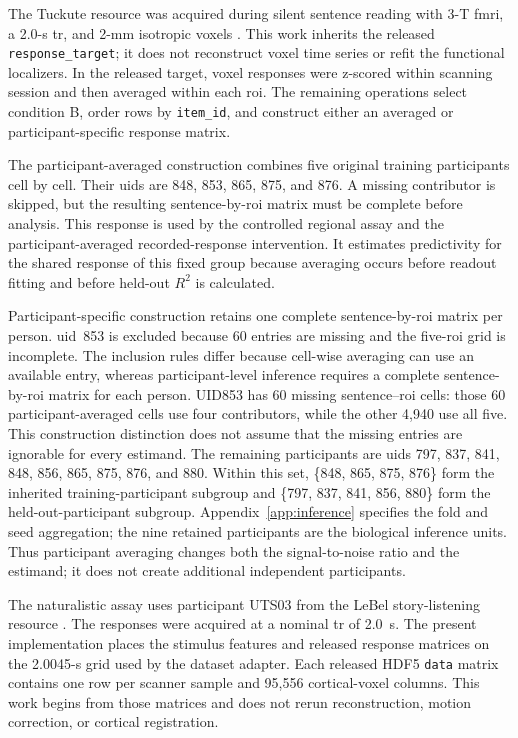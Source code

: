 The Tuckute resource was acquired during silent sentence reading with 3-T \ac{fmri}, a 2.0-s \ac{tr}, and 2-mm isotropic voxels \autocite{tuckute2024}. 
This work inherits the released \texttt{response\_target}; it does not reconstruct voxel time series or refit the functional localizers.
In the released target, voxel responses were z-scored within scanning session and then averaged within each \ac{roi}.
The remaining operations select condition B, order rows by \texttt{item\_id}, and construct either an averaged or participant-specific response matrix. 

The participant-averaged construction combines five original training participants cell by cell.
Their \acp{uid} are 848, 853, 865, 875, and 876.
A missing contributor is skipped, but the resulting sentence-by-\ac{roi} matrix must be complete before analysis.
This response is used by the controlled regional assay and the participant-averaged recorded-response intervention.
It estimates predictivity for the shared response of this fixed group because averaging occurs before readout fitting and before held-out $R^2$ is calculated.

Participant-specific construction retains one complete sentence-by-\ac{roi} matrix per person.
\ac{uid}~853 is excluded because 60 entries are missing and the five-\ac{roi} grid is incomplete.
The inclusion rules differ because cell-wise averaging can use an available entry, whereas participant-level inference requires a complete sentence-by-\ac{roi} matrix for each person.
UID853 has 60 missing sentence--\ac{roi} cells: those 60 participant-averaged cells use four contributors, while the other 4,940 use all five.
This construction distinction does not assume that the missing entries are ignorable for every estimand.
The remaining participants are \acp{uid} 797, 837, 841, 848, 856, 865, 875, 876, and 880.
Within this set, \{848, 865, 875, 876\} form the inherited training-participant subgroup and \{797, 837, 841, 856, 880\} form the held-out-participant subgroup.
Appendix~\ref{app:inference} specifies the fold and seed aggregation; the nine retained participants are the biological inference units.
Thus participant averaging changes both the signal-to-noise ratio and the estimand; it does not create additional independent participants. 

The naturalistic assay uses participant UTS03 from the LeBel story-listening resource \autocite{lebel2023}.
The responses were acquired at a nominal \ac{tr} of 2.0~s. 
The present implementation places the stimulus features and released response matrices on the 2.0045-s grid used by the dataset adapter. 
Each released HDF5 \texttt{data} matrix contains one row per scanner sample and 95,556 cortical-voxel columns.
This work begins from those matrices and does not rerun reconstruction, motion correction, or cortical registration. 

